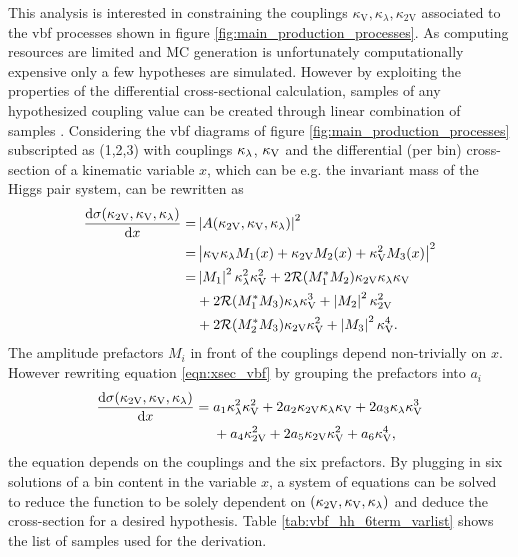 This analysis is interested in constraining the couplings $\kappa_\text{V},\kappa_\lambda,\kappa_\text{2V}$ associated to the \ac{vbf} processes shown in figure \ref{fig:main_production_processes}. As computing resources are limited and MC generation is unfortunately computationally expensive only a few hypotheses are simulated. However by exploiting the properties of the differential cross-sectional calculation, samples of any hypothesized coupling value can be created through linear combination of samples \citep{ATLAS-CONF-2019-049}. Considering the \ac{vbf} diagrams of figure \ref{fig:main_production_processes} subscripted as (1,2,3) with couplings $\kappa_\lambda$, $\kappa_\text{V}$ and \ktwov the differential (per bin) cross-section of a kinematic variable $x$, which can be e.g. the invariant mass of the Higgs pair system, can be rewritten as
\begin{align}
    \label{eqn:xsec_vbf}
    \frac{\mathrm{d}\sigma(\kappa_\text{2V}, \kappa_\text{V}, \kappa_\lambda )}{\mathrm{d} x } = &
    \left| A(\kappa_\text{2V}, \kappa_\text{V}, \kappa_\lambda ) \right|^2                                                                                               \\ \nonumber
    =                                                         & \left| \kappa_\text{V} \kappa_\lambda M_1(x    ) + \kappa_\text{2V} M_2(x  ) + \kappa_\text{V}^2 M_3(x   ) \right|^2 \\ \nonumber
    =                                                         & \left\vert M_1\right\vert^2 \kappa_\lambda^2 \kappa_\text{V}^2  + 2 \mathcal{R}(M_{1}^* M_{2})  \kappa_\text{2V} \kappa_\lambda \kappa_\text{V} \\ \nonumber
                                                              & + 2 \mathcal{R}(M_{1}^* M_{3}) \kappa_\lambda \kappa_\text{V}^3 + \left\vert M_2\right\vert^2  \kappa_\text{2V}^2        \\ \nonumber
                                                              & + 2 \mathcal{R}(M_{2}^* M_{3}) \kappa_\text{2V} \kappa_\text{V}^2 + \left\vert M_3\right\vert^2 \kappa_\text{V}^4.
\end{align}
The amplitude prefactors $M_i$ in front of the couplings depend non-trivially on $x$. However
rewriting equation \ref{eqn:xsec_vbf} by grouping the prefactors into $a_i$
\begin{align}\label{eq:reweight}
    \frac{\mathrm{d}\sigma(\kappa_\text{2V}, \kappa_\text{V}, \kappa_\lambda )}{\mathrm{d} x}
    = \; & a_1 \kappa_\lambda^2 \kappa_\text{V}^2  + 2 a_2 \kappa_\text{2V} \kappa_\lambda \kappa_\text{V}  + 2 a_3 \kappa_\lambda \kappa_\text{V}^3  \\
         & + a_4 \kappa_\text{2V}^2     + 2 a_5 \kappa_\text{2V} \kappa_\text{V}^2 + a_6\kappa_\text{V}^4, \nonumber
\end{align}
the equation depends on the couplings and the six prefactors. By plugging in six solutions of a bin content in the variable $x$, a system of equations can be solved to reduce the function to be solely dependent on $(\kappa_\text{2V}, \kappa_\text{V}, \kappa_\lambda )$ and deduce the cross-section for a desired hypothesis. Table \ref*{tab:vbf_hh_6term_varlist} shows the list of samples used for the derivation.
